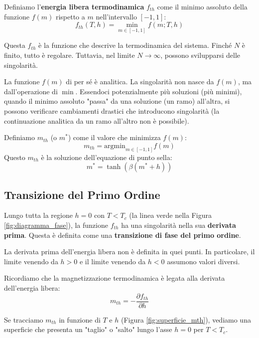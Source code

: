 Definiamo l'\textbf{energia libera termodinamica} $f_{th}$ come il minimo assoluto della funzione $f(m)$ rispetto a $m$ nell'intervallo $[-1, 1]$:
\begin{equation}
    f_{th}(T, h) = \min_{m \in [-1, 1]} f(m; T, h)
\end{equation}

Questa $f_{th}$ è la funzione che descrive la termodinamica del sistema. Finché $N$ è finito, tutto è regolare. Tuttavia, nel limite $N \to \infty$, possono svilupparsi delle singolarità.

La funzione $f(m)$ di per sé è analitica. La singolarità non nasce da $f(m)$, ma dall'operazione di $\min$. Essendoci potenzialmente più soluzioni (più minimi), quando il minimo assoluto "passa" da una soluzione (un ramo) all'altra, si possono verificare cambiamenti drastici che introducono singolarità (la continuazione analitica da un ramo all'altro non è possibile).

Definiamo $m_{th}$ (o $m^*$) come il valore che minimizza $f(m)$:
\begin{equation}
    m_{th} = \text{argmin}_{m \in [-1, 1]} f(m)
\end{equation}
Questo $m_{th}$ è la soluzione dell'equazione di punto sella:
\begin{equation}
    m^* = \tanh(\beta(m^* + h))
\end{equation}


\subsection{Transizione del Primo Ordine}
Lungo tutta la regione $h=0$ con $T < T_c$ (la linea verde nella Figura \ref{fig:diagramma_fase}), la funzione $f_{th}$ ha una singolarità nella sua \textbf{derivata prima}. Questa è definita come una \textbf{transizione di fase del primo ordine}.

La derivata prima dell'energia libera non è definita in quei punti. In particolare, il limite venendo da $h > 0$ e il limite venendo da $h < 0$ assumono valori diversi. 

\noindent Ricordiamo che la magnetizzazione termodinamica è legata alla derivata dell'energia libera:
\begin{equation}
    m_{th} = - \frac{\partial f_{th}}{\partial h}
\end{equation}


Se tracciamo $m_{th}$ in funzione di $T$ e $h$ (Figura \ref{fig:superficie_mth}), vediamo una superficie che presenta un "taglio" o "salto" lungo l'asse $h=0$ per $T < T_c$.

